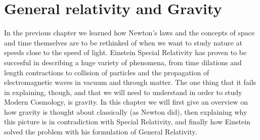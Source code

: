 \chapter{General relativity and Gravity}

In the previous chapter we learned how Newton's laws and the concepts of space and time themselves are to be rethinked of when we want to study nature at speeds close to the speed of light. Einstein Special Relativity has proven to be succesful in describing a huge variety of phenomena, from time dilations and length contractions to collision of particles and the propagation of electromagnetic waves in vacuum and through matter. The one thing that it fails in explaining, though, and that we will need to understand in order to study Modern Cosmology, is gravity. In this chapter we will first give an overview on how gravity is thought about classically (as Newton did), then explaining why this picture is in contradiction with Special Relativity, and finally how Einstein solved the problem with his formulation of General Relativity.

